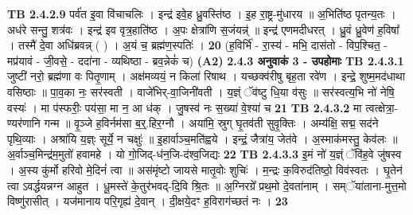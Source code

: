 \documentclass[17pt]{extarticle}
\begin{document}
                  \newline
                                \textbf{ TB 2.4.2.9} \newline
                  पर्व॑त इ॒वा वि॑चाचलिः । इन्द्र॑ इवे॒ह ध्रु॒वस्ति॑ष्ठ । इ॒ह रा॒ष्ट्र-मु॑धारय ॥ अ॒भिति॑ष्ठ पृतन्य॒तः । अध॑रे सन्तु॒ शत्र॑वः । इन्द्र॑ इव वृत्र॒हाति॑ष्ठ । अ॒पः क्षेत्रा॑णि स॒जंयन्न्॑ ॥ इन्द्र॑ एणमदीधरत् । ध्रु॒वं ध्रु॒वेण॑ ह॒विषा᳚ । तस्मै॑ दे॒वा अधि॑ब्रवन्न् ( ) । अ॒यं च॒ ब्रह्म॑ण॒स्पतिः॑ । \textbf{ 20} \newline
                  \newline
                                    (ह॒विर्भि॑ - रा॒स्य॑ - मभि॒ दास॑तो - विप॒श्चित॒ - मप्र॑यावं - जी॒वसे॒ - ददा॑ना - व्यथिष्ठा - ब्रव॒न्नेकं॑ च) \textbf{(A2)} \newline \newline
                \textbf{ 2.4.3      अनुवाकं   3 - उपहोमाः} \newline
                                \textbf{ TB 2.4.3.1} \newline
                  जुष्टी॑ नरो॒ ब्रह्म॑णा वः पितृ॒णाम् । अक्ष॑मव्ययं॒ न किला॑ रिषाथ । यच्छक्व॑रीषु बृह॒ता रवे॑ण । इन्द्रे॒ शुष्म॒मद॑धाथा वसिष्ठाः ॥ पा॒व॒का नः॒ सर॑स्वती । वाजे॑भिर्-वा॒जिनी॑वती । य॒ज्ञ्ं ॅव॑ष्टु धि॒या व॑सुः ॥ सर॑स्वत्य॒भि नो॑ नेषि॒ वस्यः॑ । मा प॑स्फरीः॒ पय॑सा॒ मा न॒ आ ध॑क् । जु॒षस्व॑ नः स॒ख्या॑ वे॒श्या॑ च \textbf{ 21} \newline
                  \newline
                                \textbf{ TB 2.4.3.2} \newline
                  मा त्वत्क्षेत्रा॒-ण्यर॑णानि गन्म ॥ वृ॒ञ्जे ह॒विर्नम॑सा ब॒र्॒.हिर॒ग्नौ । अया॑मि॒ स्रुग् घृ॒तव॑ती सुवृ॒क्तिः । अम्य॑क्षि॒ सद्म॒ सद॑ने पृथि॒व्याः । अश्रा॑यि य॒ज्ञ्ः सूर्ये॒ न चक्षुः॑ ॥ इ॒हार्वाञ्च॒मति॑ह्वये । इन्द्रं॒ जैत्रा॑य॒ जेत॑वे । अ॒स्माक॑मस्तु॒ केव॑लः ॥ अ॒र्वाञ्च॒मिन्द्र॑म॒मुतो॑ हवामहे । यो गो॒जिद्-ध॑न॒जि-द॑श्व॒जिद्यः \textbf{ 22} \newline
                  \newline
                                \textbf{ TB 2.4.3.3} \newline
                  इ॒मं नो॑ य॒ज्ञ्ं ॅवि॑ह॒वे जु॑षस्व । अ॒स्य कु॑र्मो हरिवो मे॒दिनं॑ त्वा ॥ अस॑मृंष्टो जायसे मातृ॒वोः शुचिः॑ । म॒न्द्रः क॒विरुद॑तिष्ठो॒ विव॑स्वतः । घृ॒तेन॑ त्वा ऽवर्द्धयन्नग्न आहुत । धू॒मस्ते॑ के॒तुर॑भवद्-दि॒वि श्रि॒तः ॥ अ॒ग्निरग्रे᳚ प्रथ॒मो दे॒वता॑नाम् । सम्ॅया॑ताना-मुत्त॒मो विष्णु॑रासीत् । यज॑मानाय परि॒गृह्य॑ दे॒वान् । दी॒क्षये॒दꣳ ह॒विराग॑च्छतं नः । \textbf{ 23} \newline
\end{document}
